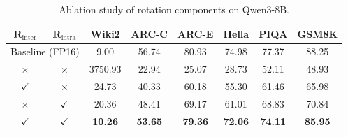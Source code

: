 \begin{table}[h]
\centering
\caption{Ablation study of rotation components on Qwen3-8B.}
\label{tab:ablation_component}
{
\begin{tabular}{cc|cccccc}
\toprule
$\mathbf{R}_{\text{inter}}$ & $\mathbf{R}_{\text{intra}}$ & \textbf{Wiki2} & \textbf{ARC-C} & \textbf{ARC-E} & \textbf{Hella} & \textbf{PIQA} & \textbf{GSM8K} \\
\midrule
\multicolumn{2}{c|}{Baseline (FP16)} & 9.00 & 56.74 & 80.93 & 74.98 & 77.37 & 88.25 \\
\midrule
$\times$ & $\times$ & 3750.93 & 22.94 & 25.07 & 28.73 & 52.11 & 48.93 \\
$\checkmark$ & $\times$ & 24.73 & 40.33 & 60.18 & 55.30 & 61.46 & 65.98 \\
$\times$ & $\checkmark$ & 20.36 & 48.41 & 69.17 & 61.01 & 68.83 & 70.84 \\
$\checkmark$ & $\checkmark$ & \textbf{10.26} & \textbf{53.65} & \textbf{79.36} & \textbf{72.06} & \textbf{74.11} & \textbf{85.95} \\
\bottomrule
\end{tabular}
}
\end{table}